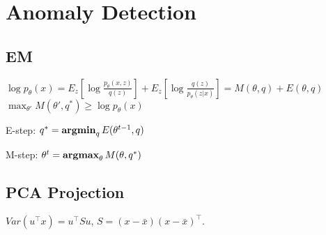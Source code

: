 \section{Anomaly Detection}
\subsection*{EM}
$\log p_\theta(x) = E_z[\log \frac{p_\theta(x, z)}{q(z)}] + E_z[\log\frac{q(z)}{p_\theta(z | x)}] = M(\theta, q) + E(\theta, q)$
$\max_{\theta'} M(\theta', q^*) \ge \log p_\theta(x)$

E-step: $q^* = \operatorname{\textbf{argmin}}_q E(\theta^{t-1}, q)$

M-step: $\theta^t = \operatorname{\textbf{argmax}}_\theta M(\theta, q^*)$

\subsection*{PCA Projection}

$Var(u^\top x) = u^\top S u$, $S = (x - \bar{x})(x - \bar{x})^\top$.

